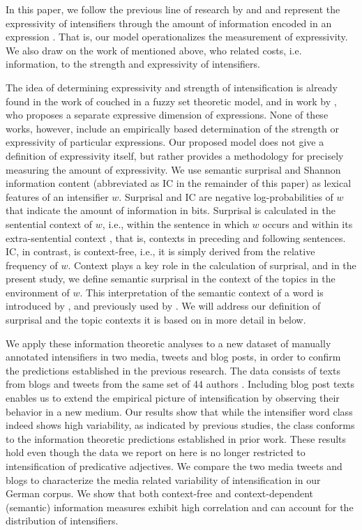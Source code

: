 \documentclass[output=paper,colorlinks,citecolor=brown]{langscibook}
\begin{document}
In this paper, we follow the previous line of research by \citet{richter2020ranking} and \citet{scherihou2022} and represent the expressivity of intensifiers through  the amount of information encoded in an expression  \citep{shannon1948mathematical}. That is, our model operationalizes the measurement of expressivity. We also draw on the work of \citet{bennett2018extremely} mentioned above, who related costs, i.e. information, to the strength and expressivity of intensifiers.


The idea of  determining expressivity and strength of intensification is already found in the work of \citet{zadeh1972fuzzy} couched in a fuzzy set theoretic model, and in work by \citet{potts2007expressive}, who proposes a separate expressive dimension of expressions. None of these works, however, include an empirically based determination of the  strength or expressivity of particular expressions. Our proposed model does not give a definition of expressivity itself, but rather provides a methodology for precisely measuring the amount of expressivity.
We use semantic surprisal and Shannon information content (abbreviated as IC in the remainder of this paper) as lexical features of an intensifier $w$. Surprisal and IC are negative log-probabilities of $w$ that indicate the amount of information in bits. Surprisal is calculated in the sentential context of $w$, i.e., within the sentence in which $w$ occurs and within its extra-sentential context \citep{levy2008expectation}, that is, contexts in preceding and following sentences.
IC, in contrast, is context-free, i.e., it is simply derived from the relative frequency of $w$. 
Context plays a key role in the calculation of surprisal, and in the present study, we define semantic surprisal in the context of the 
topics in the environment of $w$. This interpretation of the semantic context of a word is introduced by \citet{koelbl2020keyword, koelbl2021semantic}, and previously used by \citet{philipp2022keyword,philipp2023idioms}. 
We will address our definition of surprisal and the topic contexts it is based on in more detail in  below.


We apply these information theoretic analyses to a new dataset of manually annotated intensifiers in two media, tweets and blog posts, in order to confirm  the predictions established in the previous research. The data consists of texts from blogs and tweets from the same set of 44 authors \citep{schefflerEtal2023corpus}. Including blog post texts enables us to extend the empirical picture of intensification by observing their behavior in a new medium. Our results show that while the intensifier word class indeed shows high variability, as indicated by previous studies, the class conforms to the information theoretic predictions established in prior work. These results hold even though the data we report on here is no longer restricted to  intensification of predicative adjectives. We compare the two media tweets and blogs to characterize the media related variability of intensification in our German corpus. We show that both context-free and context-dependent (semantic) information measures exhibit high correlation and can account for the distribution of intensifiers. 
\end{document}
